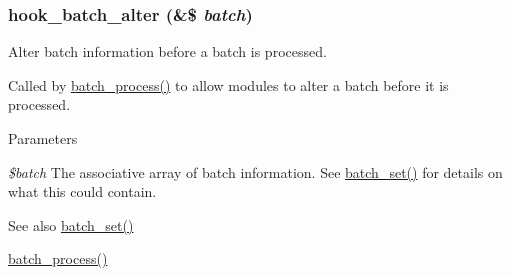 \hypertarget{group__batch_ga135f2f5d27bc51f905cf9f36bde06a2e}{
\subsubsection[{hook\_\-batch\_\-alter}]{\setlength{\rightskip}{0pt plus 5cm}hook\_\-batch\_\-alter (\&\$ {\em batch})}}
\label{group__batch_ga135f2f5d27bc51f905cf9f36bde06a2e}
Alter batch information before a batch is processed.

Called by \hyperlink{group__batch_gab17f59692632a482cee4f65f27d082f7}{batch\_\-process()} to allow modules to alter a batch before it is processed.


\begin{DoxyParams}{Parameters}
\item[{\em \$batch}]The associative array of batch information. See \hyperlink{group__batch_ga9ff3f18b3bdd1d62ab7ac681a22a7170}{batch\_\-set()} for details on what this could contain.\end{DoxyParams}
\begin{DoxySeeAlso}{See also}
\hyperlink{group__batch_ga9ff3f18b3bdd1d62ab7ac681a22a7170}{batch\_\-set()} 

\hyperlink{group__batch_gab17f59692632a482cee4f65f27d082f7}{batch\_\-process()} 
\end{DoxySeeAlso}
